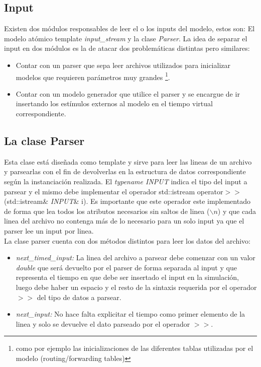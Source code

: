 \documentclass[10pt,a4paper]{article}
\begin{document}
\subsection{Input}
Existen dos módulos responsables de leer el o los inputs del modelo, estos son: El modelo atómico template \textit{input\_stream} y la clase \textit{Parser}. La idea de separar el input en dos módulos es la de atacar dos problemáticas distintas pero similares:

\begin{itemize}
\item Contar con un parser que sepa leer archivos utilizados para inicializar modelos que requieren parámetros muy grandes \footnote{como por ejemplo las inicializaciones de las diferentes tablas utilizadas por el modelo (routing/forwarding tables)}.
\item Contar con un modelo generador que utilice el parser y se encargue de ir insertando los estímulos externos al modelo en el tiempo virtual correspondiente.\\
\end{itemize}

\subsection{La clase Parser}
Esta clase está diseñada como template y sirve para leer las lineas de un archivo y parsearlas con el fin de devolverlas en la estructura de datos correspondiente según la instanciación realizada. El \textit{typename INPUT} indica el tipo del input a parsear y el mismo debe implementar el operador std::istream \textsf{operator}$>>$(\textsf{std::istream}\& \textit{INPUT}\& i). Es importante que este operador este implementado de forma que lea todos los atributos necesarios sin saltos de linea ($\backslash n$) y que cada linea del archivo no contenga más de lo necesario para un solo input ya que el parser lee un input por linea.\\

La clase parser cuenta con dos métodos distintos para leer los datos del archivo:
\begin{itemize}
\item \textit{next\_timed\_input:} La linea del archivo a parsear debe comenzar con un valor \textit{double} que será devuelto por el parser de forma separada al input y que representa el tiempo en que debe ser insertado el input en la simulación, luego debe haber un espacio y el resto de la sintaxis requerida por el operador $>>$ del tipo de datos a parsear. 
\item \textit{next\_input:} No hace falta explicitar el tiempo como primer elemento de la linea y solo se devuelve el dato parseado por el operador $>>$.
\end{itemize}
\end{document}

